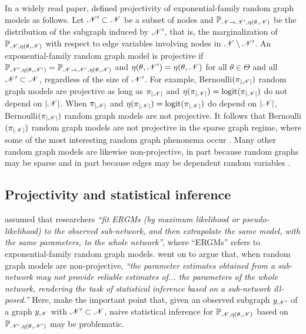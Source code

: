 \documentclass[12pt]{article}
\begin{document}
In a widely read paper,
\citet{ShRi11} defined projectivity of exponential-family random graph models as follows. 
Let $\mathscr{N}'\subset\mathscr{N}$ be a subset of nodes and $\mathbb{P}_{\mathscr{N}\to\mathscr{N}',\eta(\theta, \mathscr{N})}$ be the distribution of the subgraph induced by $\mathscr{N}'$,
that is,
the marginalization of $\mathbb{P}_{\mathscr{N},\eta(\theta, \mathscr{N})}$ with respect to edge variables involving nodes in $\mathscr{N}\setminus\mathscr{N}'$.
An exponential-family random graph model is projective if $\mathbb{P}_{\mathscr{N}',\eta(\theta, \mathscr{N}')} = \mathbb{P}_{\mathscr{N}\to\mathscr{N}',\eta(\theta, \mathscr{N})}$ and $\eta(\theta, \mathscr{N}') = \eta(\theta, \mathscr{N})$ for all $\theta \in \Theta$  and all $\mathscr{N}' \subset \mathscr{N}$,
regardless of the size of $\mathscr{N}'$.
For example, 
Bernoulli$(\pi_{|\mathscr{N}|})$ random graph models are projective as long as $\pi_{|\mathscr{N}|}$ and $\eta(\pi_{|\mathscr{N}|}) = \operatorname{logit}(\pi_{|\mathscr{N}|})$ do not depend on $\lvert\mathscr{N}\rvert$.
When $\pi_{|\mathscr{N}|}$ and $\eta(\pi_{|\mathscr{N}|}) = \operatorname{logit}(\pi_{|\mathscr{N}|})$ do depend on $\lvert\mathscr{N}\rvert$, 
Bernoulli$(\pi_{|\mathscr{N}|})$ random graph models are not projective.
It follows that Bernoulli$(\pi_{|\mathscr{N}|})$ random graph models are not projective in the sparse graph regime,
where some of the most interesting random graph phenonema occur \citep{ErRe60}.
Many other random graph models are likewise non-projective,
in part because random graphs may be sparse \citep{ErRe60} and in part because edges may be dependent random variables \citep{ShRi11}.

\subsection{Projectivity and statistical inference}
\label{statistical.inference}

\citet[][page~509]{ShRi11} assumed that researchers \emph{``fit ERGMs (by maximum likelihood or pseudo-likelihood) to the observed sub-network, and then extrapolate the same model, with the same parameters, to the whole network''},
where ``ERGMs'' refers to exponential-family random graph models. 
\citet[][page~510]{ShRi11} went on to argue that,
when random graph models are non-projective,
\emph{``the parameter estimates obtained from a sub-network may not provide reliable estimates of... the parameters of the whole network, rendering the task of statistical inference based on a sub-network ill-posed.''}  
Here,
\citeauthor{ShRi11} make the important point that,
given an observed subgraph $y_{\mathscr{N}'}$ of a graph $y_{\mathscr{N}}$ with $\mathscr{N}'\subset\mathscr{N}$, 
naive statistical inference for $\mathbb{P}_{\mathscr{N},\eta(\theta, \mathscr{N})}$ based on $\mathbb{P}_{\mathscr{N}',\eta(\theta, \mathscr{N}')}$ may be problematic.
\end{document}
